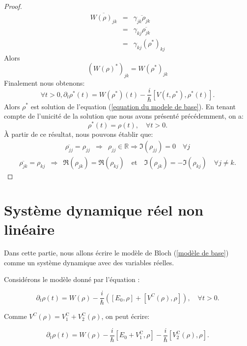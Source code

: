 \documentclass[12pt,a4paper,openany,oneside]{book}
\begin{document}
{{{{{{\begin{proof}
\begin{eqnarray*}
\overline{W(\rho)_{jk}} & = & \overline{\gamma_{jk}\rho_{jk}}\\
                                 & = & \gamma_{kj}\overline{\rho_{jk}}\\
                                 & = & \gamma_{kj}(\rho^{*})_{kj}       
\end{eqnarray*}
Alors $$ (W(\rho)^{*})_{jk}= W(\rho^{*})_{jk} $$
%
Finalement nous obtenons:
%
$$  
\forall t>0, \partial_{t}\rho^{*}(t) = W(\rho^{*})(t) - \dfrac{i}{\hbar}[V(t,\rho^{*}),\rho^{*}(t)].
$$
Alors $ \rho^{*} $ est solution de l'equation (\ref{equation du modele de base}).
%
En tenant compte de l'unicité de la solution que nous avons présenté précédemment, on a:                        
$$\rho^{*}(t) = \rho(t), \quad \forall t>0. $$
%
À partir de ce résultat, nous pouvons établir que:
\begin{eqnarray*}
\overline{\rho_{jj}}= \rho_{jj} & \Rightarrow & \rho_{jj} \in \mathbb{R} \Rightarrow \Im(\rho_{jj})=0 \quad \forall j
\end{eqnarray*}
\begin{eqnarray}\label{FA}
\overline{\rho_{jk}}= \rho_{kj} &\Rightarrow & \Re(\rho_{jk}) = \Re(\rho_{kj})\quad \textrm{et}\quad \Im(\rho_{jk}) = -\Im(\rho_{kj}) \quad \forall j\neq k.                     
\end{eqnarray}
\end{proof}

\section{Système dynamique réel non linéaire}

Dans cette partie, nous allons écrire le modèle de Bloch (\ref{modèle de base}) comme un système dynamique avec des variables réelles.

Considérons le modèle donné par l'équation :

\begin{equation}
   \partial_{t}\rho(t)  = W(\rho)-\dfrac{i}{\hbar}\left([E_{0},\rho]+[V^{C}(\rho),\rho]\right),\quad \forall t>0. 
\end{equation}

Comme $ V^{C}(\rho)= V_{1}^{\textrm{C}}+V_{2}^{\textrm{C}}(\rho) $, on peut écrire:
 
\begin{equation}\label{Dynamique de densité}
\partial_{t}\rho(t)  =  W(\rho)-\dfrac{i}{\hbar}[E_{0}+V_{1}^{\textrm{C}},\rho] - \dfrac{i}{\hbar}[V_{2}^{\textrm{C}}(\rho),\rho].
\end{equation}

}}}}}}
\end{document}
